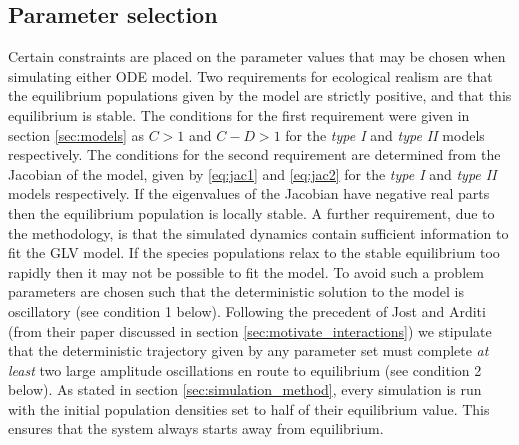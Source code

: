 
\subsection{Parameter selection}
\label{sec:param_selection}

Certain constraints are placed on the parameter values that may be chosen when simulating either ODE model. Two requirements for ecological realism are that the equilibrium populations given by the model are strictly positive, and that this equilibrium is stable. The conditions for the first requirement were given in section \ref{sec:models} as $C>1$ and $C-D>1$ for the \emph{type I} and \emph{type II} models respectively. The conditions for the second requirement are determined from the Jacobian of the model, given by \eqref{eq:jac1} and \eqref{eq:jac2} for the \emph{type I} and \emph{type II} models respectively. If the eigenvalues of the Jacobian have negative real parts then the equilibrium population is locally stable. A further requirement, due to the methodology, is that the simulated dynamics contain sufficient information to fit the GLV model. If the species populations relax to the stable equilibrium too rapidly then it may not be possible to fit the model. To avoid such a problem parameters are chosen such that the deterministic solution to the model is oscillatory (see condition 1 below). Following the precedent of Jost and Arditi (from their paper \cite{jost2000identifying} discussed in section \ref{sec:motivate_interactions}) we stipulate that the deterministic trajectory given by any parameter set must complete \emph{at least} two large amplitude oscillations en route to equilibrium (see condition 2 below). As stated in section \ref{sec:simulation_method}, every simulation is run with the initial population densities set to half of their equilibrium value. This ensures that the system always starts away from equilibrium.

